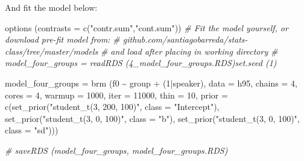 \documentclass[
]{book}
\newenvironment{Shaded}{\begin{snugshade}}{\end{snugshade}}
\newcommand{\AttributeTok}[1]{\textcolor[rgb]{0.77,0.63,0.00}{#1}}
\newcommand{\CommentTok}[1]{\textcolor[rgb]{0.56,0.35,0.01}{\textit{#1}}}
\newcommand{\DecValTok}[1]{\textcolor[rgb]{0.00,0.00,0.81}{#1}}
\newcommand{\FunctionTok}[1]{\textcolor[rgb]{0.00,0.00,0.00}{#1}}
\newcommand{\NormalTok}[1]{#1}
\newcommand{\OtherTok}[1]{\textcolor[rgb]{0.56,0.35,0.01}{#1}}
\newcommand{\SpecialCharTok}[1]{\textcolor[rgb]{0.00,0.00,0.00}{#1}}
\newcommand{\StringTok}[1]{\textcolor[rgb]{0.31,0.60,0.02}{#1}}
\begin{document}
And fit the model below:

\begin{Shaded}
\begin{Highlighting}[]
\FunctionTok{options}\NormalTok{ (}\AttributeTok{contrasts =} \FunctionTok{c}\NormalTok{(}\StringTok{"contr.sum"}\NormalTok{,}\StringTok{"cont.sum"}\NormalTok{))}
\CommentTok{\# Fit the model yourself, or download pre{-}fit model from: }
\CommentTok{\# github.com/santiagobarreda/stats{-}class/tree/master/models}
\CommentTok{\# and load after placing in working directory}
\CommentTok{\#  model\_four\_groups = readRDS (\textquotesingle{}4\_model\_four\_groups.RDS\textquotesingle{})set.seed (1)}

\NormalTok{model\_four\_groups }\OtherTok{=}  
  \FunctionTok{brm}\NormalTok{ (f0 }\SpecialCharTok{\textasciitilde{}}\NormalTok{ group }\SpecialCharTok{+}\NormalTok{ (}\DecValTok{1}\SpecialCharTok{|}\NormalTok{speaker), }\AttributeTok{data =}\NormalTok{ h95, }\AttributeTok{chains =} \DecValTok{4}\NormalTok{, }\AttributeTok{cores =} \DecValTok{4}\NormalTok{, }
       \AttributeTok{warmup =} \DecValTok{1000}\NormalTok{, }\AttributeTok{iter =} \DecValTok{11000}\NormalTok{, }\AttributeTok{thin =} \DecValTok{10}\NormalTok{, }
       \AttributeTok{prior =} \FunctionTok{c}\NormalTok{(}\FunctionTok{set\_prior}\NormalTok{(}\StringTok{"student\_t(3, 200, 100)"}\NormalTok{, }\AttributeTok{class =} \StringTok{"Intercept"}\NormalTok{),}
                              \FunctionTok{set\_prior}\NormalTok{(}\StringTok{"student\_t(3, 0, 100)"}\NormalTok{, }\AttributeTok{class =} \StringTok{"b"}\NormalTok{),}
                              \FunctionTok{set\_prior}\NormalTok{(}\StringTok{"student\_t(3, 0, 100)"}\NormalTok{, }\AttributeTok{class =} \StringTok{"sd"}\NormalTok{)))}

\CommentTok{\#  saveRDS (model\_four\_groups, \textquotesingle{}model\_four\_groups.RDS\textquotesingle{})}
\end{Highlighting}
\end{Shaded}
\end{document}

